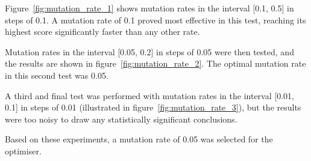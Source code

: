 \documentclass{acm_proc_article-sp}
\begin{document}
Figure~\ref{fig:mutation_rate_1} shows mutation rates in the interval [0.1, 0.5] in steps of 0.1. A mutation rate of 0.1 proved most effective in this test, reaching its highest score significantly faster than any other rate.

Mutation rates in the interval [0.05, 0.2] in steps of 0.05 were then tested, and the results are shown in figure~\ref{fig:mutation_rate_2}. The optimal mutation rate in this second test was 0.05.

A third and final test was performed with mutation rates in the interval [0.01, 0.1] in steps of 0.01 (illustrated in figure~\ref{fig:mutation_rate_3}), but the results were too noisy to draw any statistically significant conclusions.

Based on these experiments, a mutation rate of 0.05 was selected for the optimiser.
\end{document}
